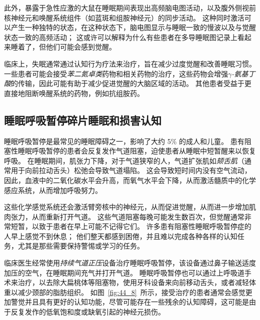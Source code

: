 此外，暴露于急性应激的大鼠在睡眠期间表现出高频脑电图活动，以及腹外侧视前核神经元和唤醒系统组件（如蓝斑和组胺神经元）的同步活动。
这种同时激活可以产生一种独特的状态，在这种状态下，脑电图显示与睡眠一致的慢波以及与觉醒状态一致的高频活动；
这或许可以解释为什么有些患者在多导睡眠图记录上看起来睡着了，但他们可能会感到觉醒。


临床上，失眠通常通过认知行为疗法来治疗，旨在减少过度觉醒和改善睡眠习惯。
一些患者可能会接受\textit{苯二氮卓类}药物和相关药物的治疗，这些药物会增强\textit{$\gamma$-氨基丁酸}的传输，因此可能有助于减少促进觉醒的大脑区域的活动。
其他患者受益于更直接地阻断唤醒系统的药物，例如抗组胺药。


\subsection{睡眠呼吸暂停碎片睡眠和损害认知}

睡眠呼吸暂停是最常见的睡眠障碍之一，影响了大约 5\% 的成人和儿童。
患有阻塞性睡眠呼吸暂停的患者会反复发作气道阻塞，迫使患者从睡眠中短暂醒来以恢复呼吸。
在睡眠期间，肌张力下降，对于气道狭窄的人，气道扩张肌如\textit{颏舌肌}（通常用于向前拉动舌头）松弛会导致气道塌陷。
这会导致短时间内没有空气流动，因此，血液中的二氧化碳水平会升高，而氧气水平会下降，从而激活髓质中的化学感应系统，从而增加呼吸努力。


这些化学感觉系统还会激活臂旁核中的神经元，从而促进觉醒，从而进一步增加肌肉张力，从而重新打开气道。
这些气道阻塞每晚可能发生数百次，但觉醒通常非常短暂，以致于患者在早上可能不记得它们。
许多患有阻塞性睡眠呼吸暂停症的人早上感觉不到休息；
他们整天都感到困倦，并且难以完成各种各样的认知任务，尤其是那些需要保持警惕或学习的任务。


临床医生经常使用\textit{持续气道正压}设备治疗睡眠呼吸暂停，该设备通过鼻子输送适度加压的空气，在睡眠期间充气并打开气道。
睡眠呼吸暂停也可以通过上呼吸道手术来治疗，以去除大扁桃体等阻塞物，使用牙科设备来向前移动舌头，或者减轻体重以减少颈部的脂肪组织。
如图~\ref{fig:44_8}~所示，接受治疗的患者通常会感觉更加警觉并且具有更好的认知功能，尽管可能存在一些残余的认知障碍，这可能是由于反复发作的低氧饱和度或缺氧引起的神经元损伤。


